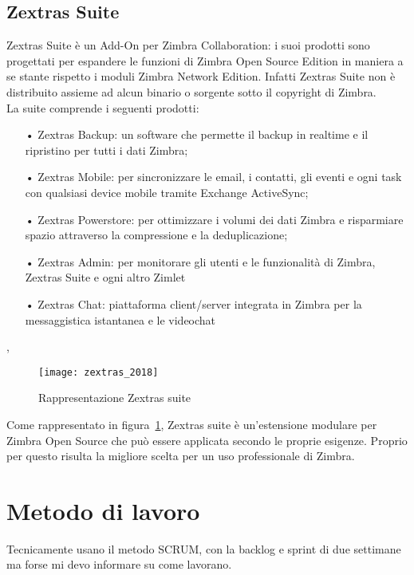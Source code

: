\subsection{Zextras Suite}
Zextras Suite è un Add-On per Zimbra Collaboration: i suoi prodotti sono progettati per espandere le funzioni di Zimbra Open Source Edition in maniera a se stante rispetto i moduli Zimbra Network Edition. Infatti Zextras Suite non è distribuito assieme ad alcun binario o sorgente sotto il copyright di Zimbra. \\
La suite comprende i seguenti prodotti:
	\begin{itemize}
		\item[•] Zextras Backup: un software che permette il backup in realtime e il ripristino per tutti i dati Zimbra;
		\item[•] Zextras Mobile: per sincronizzare le email, i contatti, gli eventi e ogni task con qualsiasi device mobile tramite Exchange ActiveSync;
		\item[•] Zextras Powerstore: per ottimizzare i volumi dei dati Zimbra e risparmiare spazio attraverso la compressione e la deduplicazione;
		\item[•] Zextras Admin: per monitorare gli utenti e le funzionalità di Zimbra, Zextras Suite e ogni altro Zimlet
		\item[•] Zextras Chat: piattaforma client/server integrata in Zimbra per la messaggistica istantanea e le videochat
	\end{itemize},

\begin{figure}[H] 
	\centering
	\texttt{[image: zextras\_2018]}
	\caption{Rappresentazione Zextras suite}
	\label{fig:modulizextras}
\end{figure}
Come rappresentato in figura~\ref{fig:modulizextras}, Zextras suite è un'estensione modulare per Zimbra Open Source che può essere applicata secondo le proprie esigenze. Proprio per questo risulta la migliore scelta per un uso professionale di Zimbra.

\section{Metodo di lavoro}
Tecnicamente usano il metodo SCRUM, con la backlog e sprint di due settimane ma forse mi devo informare su come lavorano. \\

